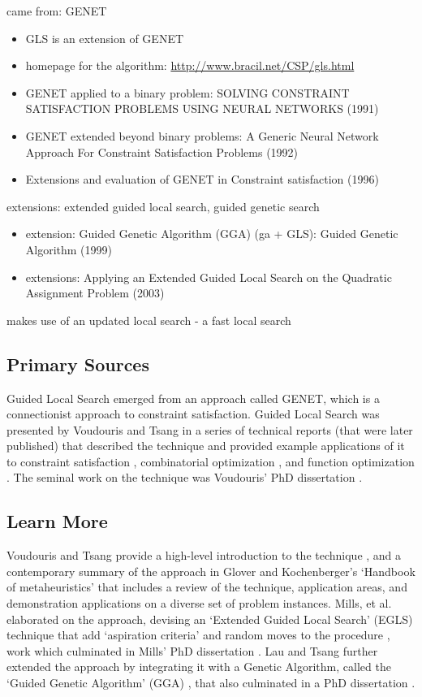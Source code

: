 \documentclass[a4paper, 11pt]{article}
\begin{document}
came from: GENET
\begin{itemize}
	\item GLS is an extension of GENET
	\item homepage for the algorithm: \url{http://www.bracil.net/CSP/gls.html}
	\item GENET applied to a binary problem: SOLVING CONSTRAINT SATISFACTION PROBLEMS USING NEURAL NETWORKS (1991)
	\item GENET extended beyond binary problems: A Generic Neural Network Approach For Constraint Satisfaction Problems (1992)
	\item Extensions and evaluation of GENET in Constraint satisfaction (1996)
\end{itemize}


extensions: extended guided local search, guided genetic search
\begin{itemize}
	\item extension: Guided Genetic Algorithm (GGA) (ga + GLS): Guided Genetic Algorithm (1999)
	\item extensions: Applying an Extended Guided Local Search on the Quadratic Assignment Problem (2003)
\end{itemize}


makes use of an updated local search - a fast local search


% 
% 
\subsection{Primary Sources}
Guided Local Search emerged from an approach called GENET, which is a connectionist approach to constraint satisfaction.
Guided Local Search was presented by Voudouris and Tsang in a series of technical reports (that were later published) that described the technique and provided example applications of it to constraint satisfaction \cite{Voudouris1994}, combinatorial optimization \cite{Voudouris1995b, Voudouris1995}, and function optimization \cite{Voudouris1995a}.
The seminal work on the technique was Voudouris' PhD dissertation \cite{Voudouris1997}.


% 
% 
\subsection{Learn More}
Voudouris and Tsang provide a high-level introduction to the technique \cite{Voudouris1998}, and a contemporary summary of the approach in Glover and Kochenberger's `Handbook of metaheuristics' \cite{Glover2003a} that includes a review of the technique, application areas, and demonstration applications on a diverse set of problem instances.
Mills, et al. elaborated on the approach, devising an `Extended Guided Local Search' (EGLS) technique that add `aspiration criteria' and random moves to the procedure \cite{Mills2003}, work which culminated in Mills' PhD dissertation \cite{Mills2002}.  
Lau and Tsang further extended the approach by integrating it with a Genetic Algorithm, called the `Guided Genetic Algorithm' (GGA) \cite{Lau1998}, that also culminated in a PhD dissertation \cite{Lau1999}.
\end{document}
